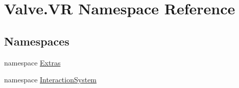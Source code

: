 \hypertarget{namespace_valve_1_1_v_r}{}\section{Valve.\+VR Namespace Reference}
\label{namespace_valve_1_1_v_r}
\subsection*{Namespaces}
\begin{DoxyCompactItemize}
\item 
namespace \mbox{\hyperlink{namespace_valve_1_1_v_r_1_1_extras}{Extras}}
\item 
namespace \mbox{\hyperlink{namespace_valve_1_1_v_r_1_1_interaction_system}{Interaction\+System}}
\end{DoxyCompactItemize}
